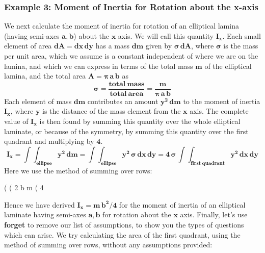 \documentclass[12pt]{article}
\begin{document}
\subsubsection*{Example 3: Moment of Inertia for Rotation about the x-axis}
We next calculate the moment of inertia for rotation of an elliptical lamina 
  (having semi-axes $\mathbf{a, b}$) about the $\mathbf{x}$ axis.
We will call this quantity $\mathbf{I_x}$.
Each small element of area $\mathbf{dA = dx\,dy}$ has a mass $\mathbf{dm}$ given by
 $\mathbf{\boldsymbol{\sigma} \,dA}$,
  where $\boldsymbol{\sigma}$ is the mass per unit area, which we assume is a constant independent of
  where we are on the lamina, and which we can express in terms of the total mass $\mathbf{m}$
  of the elliptical lamina, and the total area $\mathbf{A = \boldsymbol{\pi}\,a\,b}$ as
\begin{equation}
\mathbf{\boldsymbol{\sigma} = \frac{total\: mass}{total\: area} = \frac{m}{\boldsymbol{\pi}\,a\,b} }
\end{equation}
Each element of mass $\mathbf{dm}$ contributes an amount $\mathbf{y^2\,dm}$ to
 the moment of inertia $\mathbf{I_x}$, where $\mathbf{y}$ is the distance of
 the mass element from the $\mathbf{x}$ axis.
The complete value of $\mathbf{I_x}$ is then found by summing this quantity over the whole elliptical
  laminate, or because of the symmetry, by summing this quantity over the first
  quadrant and multiplying by $\mathbf{4}$.
\begin{equation}
\mathbf{I_x = \int \int_{ellipse} y^2\,dm =
                \int \int_{ellipse} y^2\,\boldsymbol{\sigma} \, dx\,dy =
                4\,\boldsymbol{\sigma} \, \int \int_{first \: quadrant} y^2\,dx\,dy }
\end{equation}
Here we use the method of summing over rows:
\begin{myVerbatim}
(%
(%
                                      2
                                     b  m
(%
                                      4
\end{myVerbatim} 
Hence we have derived $\mathbf{I_x = m\,b^2/4}$ for the moment of inertia of an elliptical
  laminate having semi-axes $\mathbf{a, b}$ for rotation about the $\mathbf{x}$ axis.
\newpage
\noindent Finally, let's use \textbf{forget} to remove our list of assumptions,
  to show you the types of questions which can arise.
We try calculating the area of the first quadrant, using the method of
  summing over rows, without any assumptions provided:
\end{document}
